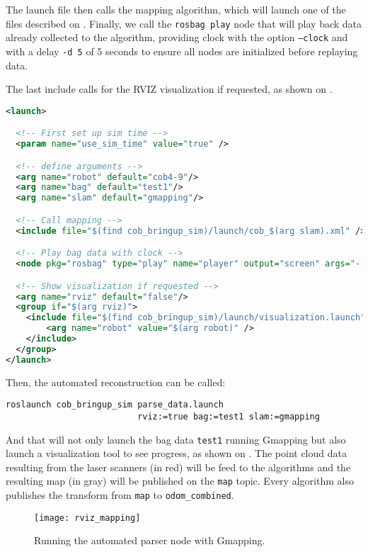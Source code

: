 The launch file then calls the mapping algorithm, which will launch one of the files described on . Finally, we call the \texttt{rosbag play} node that will play back data already collected to the algorithm, providing clock with the option \texttt{--clock} and with a delay \texttt{-d 5} of 5 seconds to ensure all nodes are initialized before replaying data.

The last include calls for the RVIZ visualization if requested, as shown on .

\begin{lstlisting}[caption={Automated data parser.},label={lst:parser},language=XML]
<launch>

  <!-- First set up sim time -->
  <param name="use_sim_time" value="true" />

  <!-- define arguments -->
  <arg name="robot" default="cob4-9"/>
  <arg name="bag" default="test1"/>
  <arg name="slam" default="gmapping"/>

  <!-- Call mapping -->
  <include file="$(find cob_bringup_sim)/launch/cob_$(arg slam).xml" />

  <!-- Play bag data with clock -->
  <node pkg="rosbag" type="play" name="player" output="screen" args="--clock -q -d 5 $(find cob_bringup_sim)/bags/$(arg bag).bag"/>

  <!-- Show visualization if requested -->
  <arg name="rviz" default="false"/>
  <group if="$(arg rviz)">
    <include file="$(find cob_bringup_sim)/launch/visualization.launch" >
        <arg name="robot" value="$(arg robot)" />
    </include>
  </group>
</launch>
\end{lstlisting}

Then, the automated reconstruction can be called:

\begin{verbatim}
roslaunch cob_bringup_sim parse_data.launch
                          rviz:=true bag:=test1 slam:=gmapping
\end{verbatim}

And that will not only launch the bag data \texttt{test1} running Gmapping but also launch a visualization tool to see progress, as shown on . The point cloud data resulting from the laser scanners (in red) will be feed to the algorithms and the resulting map (in gray) will be published on the \texttt{map} topic. Every algorithm also publishes the transform from \texttt{map} to \texttt{odom\_combined}.

\begin{figure}[!ht]
    \centering
    \texttt{[image: rviz\_mapping]}
    \caption{Running the automated parser node with Gmapping.}
    \label{fig:rviz_mapping}
\end{figure}

